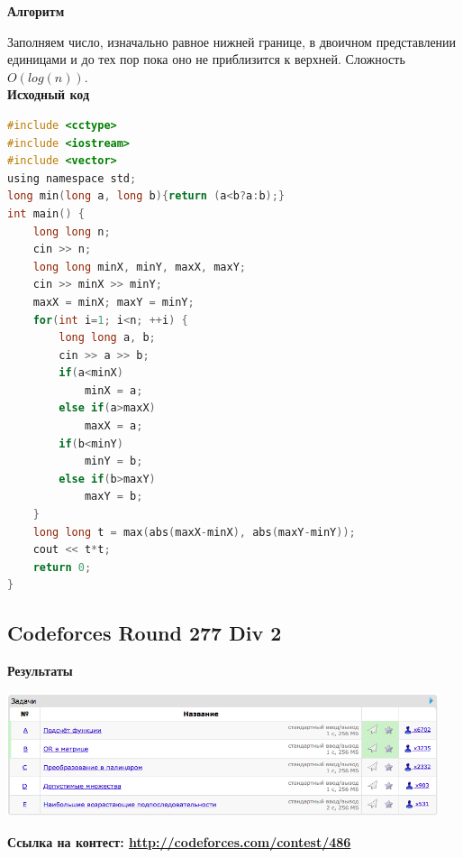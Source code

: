 \documentclass[a4paper,12pt]{article}
\begin{document}
\textbf{{\large Алгоритм}}

Заполняем число, изначально равное нижней границе, в двоичном представлении единицами и до тех пор пока оно не приблизится к верхней. Сложность $O(log(n))$.\\

\textbf{{\large Исходный код}} \\
\begin{lstlisting}[language=C]
#include <cctype>
#include <iostream>
#include <vector>
using namespace std;
long min(long a, long b){return (a<b?a:b);}
int main() {
    long long n;
    cin >> n;
    long long minX, minY, maxX, maxY;
    cin >> minX >> minY;
    maxX = minX; maxY = minY;
    for(int i=1; i<n; ++i) {
        long long a, b;
        cin >> a >> b;
        if(a<minX)
            minX = a;
        else if(a>maxX)
            maxX = a;
        if(b<minY)
            minY = b;
        else if(b>maxY)
            maxY = b;
    }
    long long t = max(abs(maxX-minX), abs(maxY-minY));
    cout << t*t;
    return 0;
}
\end{lstlisting}


%
%

\newpage
\subsection{Codeforces Round 277 Div 2}

\textbf{{\large Результаты}} \\
\begin{center}
\includegraphics[width=0.95\textwidth]{C_277/A_C_277_result.png}\\ [1cm]
\end{center}

\textbf{{\large Ссылка на контест: \url{http://codeforces.com/contest/486}}}
\end{document}
